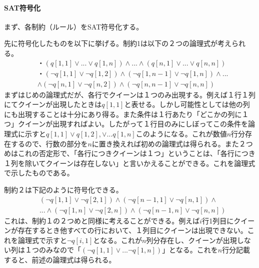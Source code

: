 \documentclass[dvipdfmx]{jsarticle}
\begin{document}
\paragraph{SAT符号化}
まず、各制約（ルール）をSAT符号化する。\par
先に符号化したものを以下に挙げる。制約1は以下の２つの論理式が考えられる。
\begin{align*}
  &・(q[1,1] \vee ... \vee q[1,n]) \wedge ... \wedge (q[n, 1] \vee ... \vee q[n,n]) \\
  &・(\neg q[1,1] \vee \neg q[1,2]) \wedge (\neg q[1,n-1] \vee \neg q[1,n]) \wedge ... \\ &\wedge (\neg q[n,1] \vee \neg q[n,2]) \wedge (\neg q[n, n-1] \vee \neg q[n,n])
\end{align*}
まずはじめの論理式だが、各行でクイーンは１つのみ出現する。例えば１行１列にてクイーンが出現したときは$q[1,1]$と表せる。しかし可能性としては他の列にも出現することは十分にあり得る。また条件は１行あたり「どこかの列に１つ」クイーンが出現すればよい。したがって１行目のみにしぼってこの条件を論理式に示すと$q[1,1] \vee q[1,2], \vee ... q[1,n]$このようになる。これが数値$n$行分存在するので、行数の部分を$n$に置き換えれば初めの論理式は得られる。また２つめはこれの否定形で、「各行につきクイーンは１つ」ということは、「各行につき１列を除いてクイーンは存在しない」と言いかえることができる。これを論理式で示したものである。\par
制約２は下記のように符号化できる。
\begin{align*}
  &(\neg q[1,1] \vee \neg q[2,1]) \wedge (\neg q[n-1, 1]\vee \neg q[n,1]) \wedge \\
  &... \wedge (\neg q[1,n] \vee \neg q[2,n]) \wedge (\neg q[n-1, n] \vee \neg q[n,n])
\end{align*}
これは、制約１の２つめと同様に考えることができる。例えば$i$行1列目にクイーンが存在するとき他すべての行において、１列目にクイーンは出現できない。これを論理式で示すと$\neg q[i, 1]$となる。これが$n$列分存在し、クイーンが出現しない列は１つのみなので「$(\neg q[1, 1] \vee ... \neg q[1,n])$」となる。これを$n$行分記載すると、前述の論理式は得られる。
\end{document}

